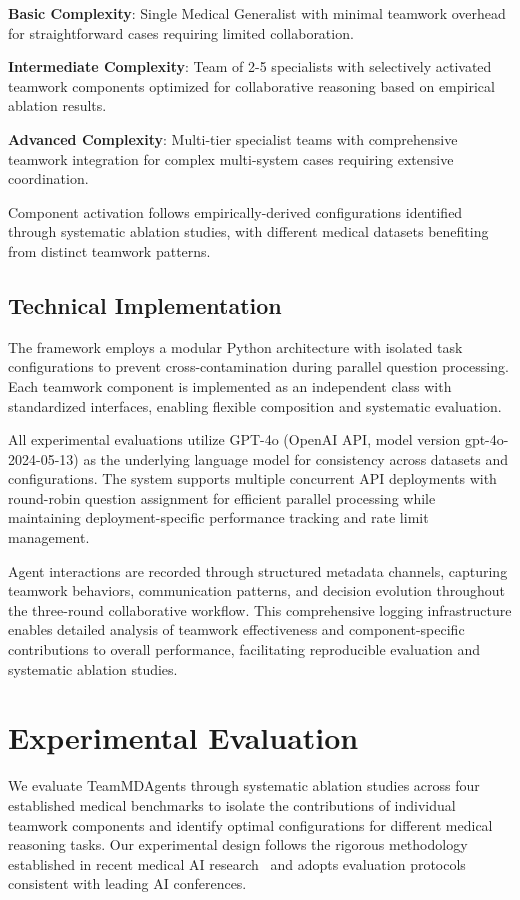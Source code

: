 \documentclass[letterpaper]{article} %
\begin{document}
\textbf{Basic Complexity}: Single Medical Generalist with minimal teamwork overhead for straightforward cases requiring limited collaboration.

\textbf{Intermediate Complexity}: Team of 2-5 specialists with selectively activated teamwork components optimized for collaborative reasoning based on empirical ablation results.

\textbf{Advanced Complexity}: Multi-tier specialist teams with comprehensive teamwork integration for complex multi-system cases requiring extensive coordination.

Component activation follows empirically-derived configurations identified through systematic ablation studies, with different medical datasets benefiting from distinct teamwork patterns. 

\subsection{Technical Implementation}

The framework employs a modular Python architecture with isolated task configurations to prevent cross-contamination during parallel question processing. Each teamwork component is implemented as an independent class with standardized interfaces, enabling flexible composition and systematic evaluation.

All experimental evaluations utilize GPT-4o (OpenAI API, model version gpt-4o-2024-05-13) as the underlying language model for consistency across datasets and configurations. The system supports multiple concurrent API deployments with round-robin question assignment for efficient parallel processing while maintaining deployment-specific performance tracking and rate limit management.

Agent interactions are recorded through structured metadata channels, capturing teamwork behaviors, communication patterns, and decision evolution throughout the three-round collaborative workflow. This comprehensive logging infrastructure enables detailed analysis of teamwork effectiveness and component-specific contributions to overall performance, facilitating reproducible evaluation and systematic ablation studies.


\section{Experimental Evaluation}


We evaluate TeamMDAgents through systematic ablation studies across four established medical benchmarks to isolate the contributions of individual teamwork components and identify optimal configurations for different medical reasoning tasks. Our experimental design follows the rigorous methodology established in recent medical AI research~\citep{kim2024mdagents} and adopts evaluation protocols consistent with leading AI conferences.
\end{document}
